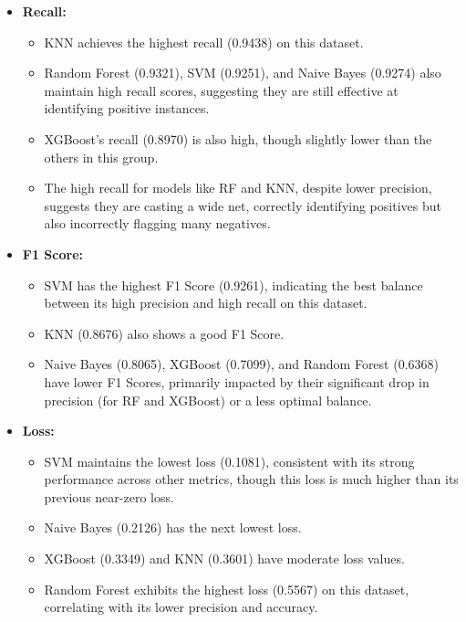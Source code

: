 \begin{itemize}
    \item \textbf{Recall:}
    \begin{itemize}
        \item KNN achieves the highest recall (0.9438) on this dataset.
        \item Random Forest (0.9321), SVM (0.9251), and Naive Bayes (0.9274) also maintain high recall scores, suggesting they are still effective at identifying positive instances.
        \item XGBoost's recall (0.8970) is also high, though slightly lower than the others in this group.
        \item The high recall for models like RF and KNN, despite lower precision, suggests they are casting a wide net, correctly identifying positives but also incorrectly flagging many negatives.
    \end{itemize}

    \item \textbf{F1 Score:}
    \begin{itemize}
        \item SVM has the highest F1 Score (0.9261), indicating the best balance between its high precision and high recall on this dataset.
        \item KNN (0.8676) also shows a good F1 Score.
        \item Naive Bayes (0.8065), XGBoost (0.7099), and Random Forest (0.6368) have lower F1 Scores, primarily impacted by their significant drop in precision (for RF and XGBoost) or a less optimal balance.
    \end{itemize}

    \item \textbf{Loss:}
    \begin{itemize}
        \item SVM maintains the lowest loss (0.1081), consistent with its strong performance across other metrics, though this loss is much higher than its previous near-zero loss.
        \item Naive Bayes (0.2126) has the next lowest loss.
        \item XGBoost (0.3349) and KNN (0.3601) have moderate loss values.
        \item Random Forest exhibits the highest loss (0.5567) on this dataset, correlating with its lower precision and accuracy.
    \end{itemize}


\end{itemize}
